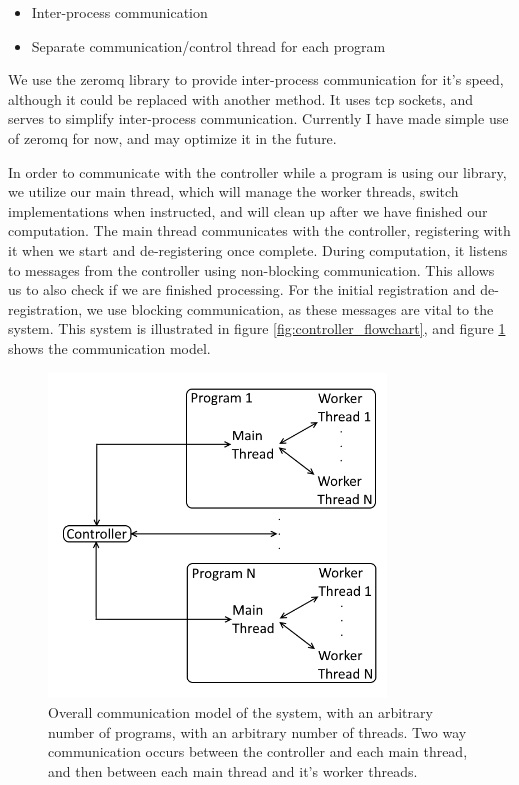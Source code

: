 \begin{itemize}
	\item Inter-process communication
	\item Separate communication/control thread for each program
\end{itemize}

We use the zeromq library to provide inter-process communication for it's speed, although it could be replaced with another method. It uses tcp sockets, and serves to simplify inter-process communication. Currently I have made simple use of zeromq for now, and may optimize it in the future.

In order to communicate with the controller while a program is using our library, we utilize our main thread, which will manage the worker threads, switch implementations when instructed, and will clean up after we have finished our computation. The main thread communicates with the controller, registering with it when we start and de-registering once complete. During computation, it listens to messages from the controller using non-blocking communication. This allows us to also check if we are finished processing. For the initial registration and de-registration, we use blocking communication, as these messages are vital to the system. This system is illustrated in figure \ref{fig:controller_flowchart}, and figure \ref{fig:communication_structure} shows the communication model.

\begin{figure}
	\centering
	\includegraphics[width=0.8\textwidth]{graphics/communication_structure.png}
	\caption{Overall communication model of the system, with an arbitrary number of programs, with an arbitrary number of threads. Two way communication occurs between the controller and each main thread, and then between each main thread and it's worker threads.}
	\label{fig:communication_structure}
\end{figure}



